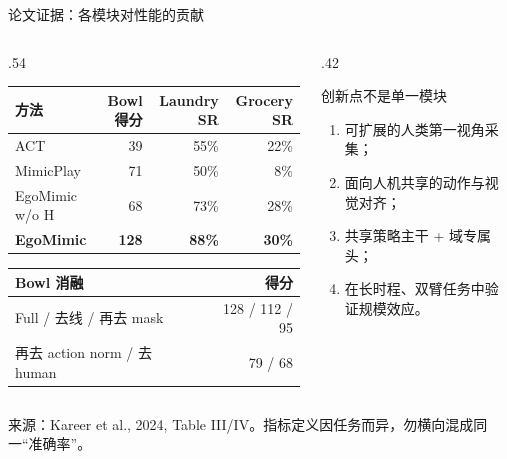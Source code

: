 \documentclass[aspectratio=169,10pt]{beamer}
\newcommand{\src}[1]{\vfill{\fontsize{5.8}{6.8}\selectfont\color{CUHKMidGray}来源：#1}}
\begin{document}
\begin{frame}{论文证据：各模块对性能的贡献}
  \small
  \begin{columns}[T,onlytextwidth]
    \begin{column}{.54\textwidth}
      \centering
      \scriptsize
      \setlength{\tabcolsep}{3pt}
      \begin{tabular}{lrrr}
        \toprule
        方法 & Bowl 得分 & Laundry SR & Grocery SR\\
        \midrule
        ACT & 39 & 55\% & 22\%\\
        MimicPlay & 71 & 50\% & 8\%\\
        EgoMimic w/o H & 68 & 73\% & 28\%\\
        \textbf{EgoMimic} & \textbf{128} & \textbf{88\%} & \textbf{30\%}\\
        \bottomrule
      \end{tabular}
      \vspace{.35cm}
      \begin{tabular}{lr}
        \toprule
        Bowl 消融 & 得分\\
        \midrule
        Full / 去线 / 再去 mask & 128 / 112 / 95\\
        再去 action norm / 去 human & 79 / 68\\
        \bottomrule
      \end{tabular}
    \end{column}
    \begin{column}{.42\textwidth}
      \begin{block}{创新点不是单一模块}
        \begin{enumerate}
          \item 可扩展的人类第一视角采集；
          \item 面向人机共享的动作与视觉对齐；
          \item 共享策略主干 + 域专属头；
          \item 在长时程、双臂任务中验证规模效应。
        \end{enumerate}
      \end{block}
    \end{column}
  \end{columns}
  \src{Kareer et al., 2024, Table III/IV。指标定义因任务而异，勿横向混成同一“准确率”。}
\end{frame}
\end{document}
